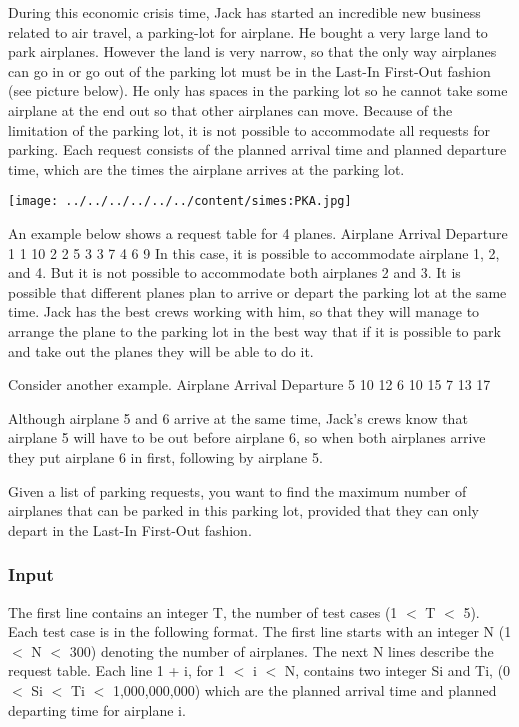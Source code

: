 

During this economic crisis time, Jack has started an incredible new business related to air travel, a parking-lot for airplane. He bought a very large land to park airplanes. However the land is very narrow, so that the only way airplanes can go in or go out of the parking lot must be in the Last-In First-Out fashion (see picture below). He only has spaces in the parking lot so he cannot take some airplane at the end out so that other airplanes can move. Because of the limitation of the parking lot, it is not possible to accommodate all requests for parking. Each request consists of the planned arrival time and planned departure time, which are the times the airplane arrives at the parking lot.


\texttt{[image: ../../../../../../content/simes:PKA.jpg]}

An example below shows a request table for 4 planes.
Airplane Arrival Departure
1 1 10
2 2 5
3 3 7
4 6 9
In this case, it is possible to accommodate airplane 1, 2, and 4. But it is not possible to accommodate both airplanes 2 and 3. It is possible that different planes plan to arrive or depart the parking lot at the same time. Jack has the best crews working with him, so that they will manage to arrange the plane to the parking lot in the best way that if it is possible to park and take out the planes they will be able to do it.

Consider another example.
Airplane Arrival Departure
5 10 12
6 10 15
7 13 17

Although airplane 5 and 6 arrive at the same time, Jack's crews know that airplane 5 will have to be out before airplane 6, so when both airplanes arrive they put airplane 6 in first, following by airplane 5.


Given a list of parking requests, you want to find the maximum number of airplanes that can be parked in this parking lot, provided that they can only depart in the Last-In First-Out fashion.

\subsubsection{Input}

The first line contains an integer T, the number of test cases (1 $<$ T $<$ 5). Each test case is in the following format. The first line starts with an integer N (1 $<$ N $<$ 300) denoting the number of airplanes. The next
N lines describe the request table. Each line 1 + i, for 1 $<$ i $<$ N, contains two integer Si and Ti, (0 $<$ Si $<$ Ti $<$ 1,000,000,000) which are the planned arrival time and planned departing time for airplane i.

